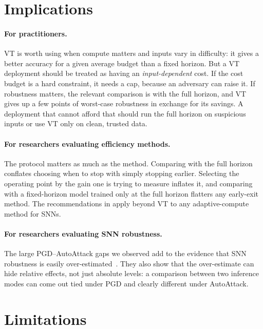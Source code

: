 \section{Implications}
\label{sec:con-implications}

\paragraph{For practitioners.} VT is worth using when compute matters and inputs vary in difficulty: it gives a better accuracy for a given average budget than a fixed horizon. But a VT deployment should be treated as having an \emph{input-dependent} cost. If the cost budget is a hard constraint, it needs a cap, because an adversary can raise it. If robustness matters, the relevant comparison is with the full horizon, and VT gives up a few points of worst-case robustness in exchange for its savings. A deployment that cannot afford that should run the full horizon on suspicious inputs or use VT only on clean, trusted data.

\paragraph{For researchers evaluating efficiency methods.} The protocol matters as much as the method. Comparing with the full horizon conflates choosing when to stop with simply stopping earlier. Selecting the operating point by the gain one is trying to measure inflates it, and comparing with a fixed-horizon model trained only at the full horizon flatters any early-exit method. The recommendations in  apply beyond VT to any adaptive-compute method for SNNs.

\paragraph{For researchers evaluating SNN robustness.} The large PGD--AutoAttack gaps we observed add to the evidence that SNN robustness is easily over-estimated~\cite{wang2026towards}. They also show that the over-estimate can hide relative effects, not just absolute levels: a comparison between two inference modes can come out tied under PGD and clearly different under AutoAttack.

\section{Limitations}
\label{sec:con-limitations}

